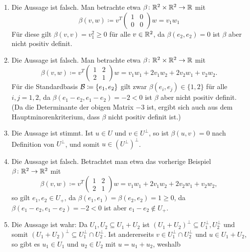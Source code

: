 \documentclass[a4paper, 10pt]{scrartcl}
\begin{document}
\begin{solution}
  \begin{enumerate}[leftmargin=*]
    \item
      Die Aussage ist falsch.
      Man betrachte etwa $\beta \colon \mathbb{R}^2 \times \mathbb{R}^2 \to \mathbb{R}$ mit
      \[
                  \beta(v, w)
        \coloneqq v^T \begin{pmatrix} 1 & 0 \\ 0 & 0 \end{pmatrix} w
        =         v_1 w_1
      \]
      Für diese gilt $\beta(v,v) = v_1^2 \geq 0$ für alle $v \in \mathbb{R}^2$, da $\beta(e_2, e_2) = 0$ ist $\beta$ aber nicht positiv definit.
    \item
      Die Aussage ist falsch.
      Man betrachte etwa $\beta \colon \mathbb{R}^2 \times \mathbb{R}^2 \to \mathbb{R}$ mit
      \[
                  \beta(v, w)
        \coloneqq v^T \begin{pmatrix} 1 & 2 \\ 2 & 1 \end{pmatrix} w
        =         v_1 w_1 + 2 v_1 w_2 + 2 v_2 w_1 + v_2 w_2.
      \]
      Für die Standardbasis $\mathcal{B} \coloneqq \{e_1, e_2\}$ gilt zwar $\beta(e_i, e_j) \in \{1, 2\}$ für alle $i, j = 1, 2$, da $\beta(e_1 - e_2, e_1 - e_2) = -2 < 0$ ist $\beta$ aber nicht positiv definit.
      (Da die Determinante der obigen Matrix $-3$ ist, ergibt sich auch aus dem Hauptminorenkriterium, dass $\beta$ nicht positiv definit ist.)
    \item
      Die Aussage ist stimmt.
      Ist $u \in U$ und $v \in U^\perp$, so ist $\beta(u,v) = 0$ nach Definition von $U^\perp$, und somit $u \in (U^\perp)^\perp$.
    \item
      Die Aussage ist falsch.
      Betrachtet man etwa das vorherige Beispiel $\beta \colon \mathbb{R}^2 \to \mathbb{R}^2$ mit
      \[
                  \beta(v, w)
        \coloneqq v^T \begin{pmatrix} 1 & 2 \\ 2 & 1 \end{pmatrix} w
        =         v_1 w_1 + 2 v_1 w_2 + 2 v_2 w_1 + v_2 w_2,
      \]
      so gilt $e_1, e_2 \in U_+$, da $\beta(e_1, e_1) = \beta(e_2, e_2) = 1 \geq 0$, da $\beta(e_1 - e_2, e_1 - e_2) = -2 < 0$ ist aber $e_1 - e_2 \notin U_+$.
    \item
      Die Aussage ist wahr:
      Da $U_1, U_2 \subseteq U_1 + U_2$ ist $(U_1 + U_2)^\perp \subseteq U_1^\perp, U_2^\perp$ und somit $(U_1 + U_2)^\perp \subseteq U_1^\perp \cap U_2^\perp$.
      Ist andererseits $v \in U_1^\perp \cap U_2^\perp$ und $u \in U_1 + U_2$, so gibt es $u_1 \in U_1$ und $u_2 \in U_2$ mit $u = u_1 + u_2$, weshalb

\end{enumerate}
\end{solution}
\end{document}
